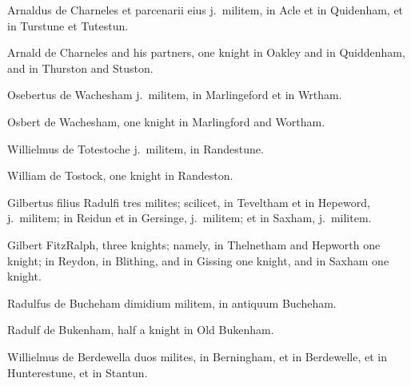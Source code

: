\documentclass[10pt]{book}
\begin{document}
\begin{paracol}{2}
\switchcolumn*

\begin{otherlanguage}{latin}
Arnaldus de Charneles et parcenarii eius j.\ militem, in Acle et in Quidenham, et in Turstune et Tutestun.
\end{otherlanguage}

\switchcolumn

Arnald de Charneles and his partners, one knight in Oakley and in Quiddenham, and in Thurston and Stuston.

\switchcolumn*

\begin{otherlanguage}{latin}
Osebertus de Wachesham j.\ militem, in Marlingeford et in Wrtham.
\end{otherlanguage}

\switchcolumn

Osbert de Wachesham, one knight in Marlingford and Wortham.

\switchcolumn*

\begin{otherlanguage}{latin}
Willielmus de Totestoche j.\ militem, in Randestune.
\end{otherlanguage}

\switchcolumn

William de Tostock, one knight in Randeston.

\switchcolumn*

\begin{otherlanguage}{latin}
Gilbertus filius Radulfi tres milites; scilicet, in Teveltham et in Hepeword, j.\ militem; in Reidun et in Gersinge, j.\ militem; et in Saxham, j.\ militem.
\end{otherlanguage}

\switchcolumn

Gilbert FitzRalph, three knights; namely, in Thelnetham and Hepworth one knight; in Reydon, in Blithing, and in Gissing one knight, and in Saxham one knight.

\switchcolumn*

\begin{otherlanguage}{latin}
Radulfus de Bucheham dimidium militem, in antiquum Bucheham.
\end{otherlanguage}

\switchcolumn

Radulf de Bukenham, half a knight in Old Bukenham.

\switchcolumn*

\begin{otherlanguage}{latin}
Willielmus de Berdewella duos milites, in Berningham, et in Berdewelle, et in Hunterestune, et in Stantun.
\end{otherlanguage}


\end{paracol}
\end{document}

